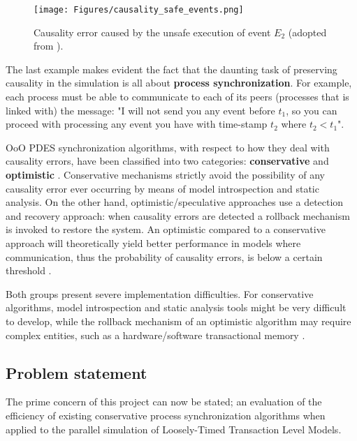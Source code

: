 \documentclass[12pt,twoside]{article}
\begin{document}
\begin{figure}[H]
\centering
\texttt{[image: Figures/causality\_safe\_events.png]}
\caption{\label{fig:causality_safe_events}Causality error caused by the unsafe execution of event $E_2$ (adopted from \cite{Fujimoto1990}).}
\end{figure}

The last example makes evident the fact that the daunting task of preserving causality in the simulation is all about \textbf{process synchronization}.
For example, each process must be able to communicate to each of its peers (processes that is linked with) the message: 
"I will not send you any event before $t_1$, so you can proceed with processing any event you have with time-stamp $t_2$ where $t_2 < t_1$".

OoO PDES synchronization algorithms, with respect to how they deal with causality errors, have been classified into two categories: \textbf{conservative} and \textbf{optimistic} \cite{Fujimoto2015}.
Conservative mechanisms strictly avoid the possibility of any causality error ever occurring by means of model introspection and static analysis.
On the other hand, optimistic/speculative approaches use a detection and recovery approach: when causality errors are detected a rollback mechanism is invoked to restore the system.
An optimistic compared to a conservative approach will theoretically yield better performance in models where communication, thus the probability of causality errors, is below a certain threshold \cite{Fujimoto1990}.

Both groups present severe implementation difficulties.
For conservative algorithms, model introspection and static analysis tools might be very difficult to develop,
while the rollback mechanism of an optimistic algorithm may require complex entities, such as a hardware/software transactional memory \cite{Anane2015} .


\subsection{Problem statement}
\label{sec-4-6}
The prime concern of this project can now be stated;
an evaluation of the efficiency of existing conservative process synchronization algorithms when applied to the parallel simulation
of Loosely-Timed Transaction Level Models.
\end{document}
